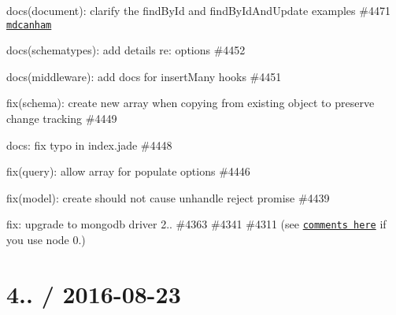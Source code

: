 \begin{DoxyItemize}
\item docs(document)\+: clarify the find\+By\+Id and find\+By\+Id\+And\+Update examples \#4471 \href{https://github.com/mdcanham}{\tt mdcanham}
\item docs(schematypes)\+: add details re\+: options \#4452
\item docs(middleware)\+: add docs for insert\+Many hooks \#4451
\item fix(schema)\+: create new array when copying from existing object to preserve change tracking \#4449
\item docs\+: fix typo in index.\+jade \#4448
\item fix(query)\+: allow array for populate options \#4446
\item fix(model)\+: create should not cause unhandle reject promise \#4439
\item fix\+: upgrade to mongodb driver 2.. \#4363 \#4341 \#4311 (see \href{https://github.com/mongodb/js-bson/commit/aa0b54597a0af28cce3530d2144af708e4b66bf0#commitcomment-18850498}{\tt comments here} if you use node 0.)
\end{DoxyItemize}

\section*{4.. / 2016-\/08-\/23 }


